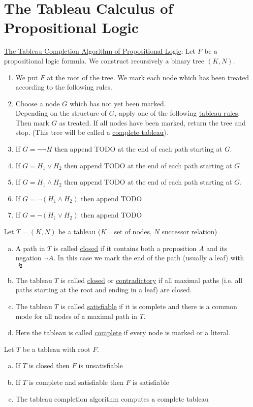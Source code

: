 \documentclass[a4paper]{article}
\newcommand{\ul}{\underline}
\begin{document}
\section{The Tableau Calculus of Propositional Logic}
\ul{The Tableau Completion Algorithm of Propositional Logic}: Let $F$ be a propositional logic formula. We construct recursively a binary tree $(K,N)$.
\begin{enumerate}[(1)]
	\item We put $F$ at the root of the tree. We mark each node which has been treated according to the following rules.
	\item Choose a node $G$ which has not yet been marked.\\
	Depending on the structure of $G$, apply one of the following \ul{tableau rules}. Then mark $G$ as treated. If all nodes have been marked, return the tree and stop. (This tree will be called a \ul{complete tableau}).
	\item If $G=\neg\neg H$ then append TODO at the end of each path starting at $G$.
	\item If $G=H_1\vee H_2$ then append TODO at the end of each path starting at $G$
	\item If $G=H_1\wedge H_2$ then append TODO at the end of each path starting at $G$.
	\item If $G=\neg (H_1\wedge H_2)$ then append TODO
	\item If $G=\neg (H_1\vee H_2)$ then append TODO
\end{enumerate}
Let $T=(K,N)$ be a tableau ($K$= set of nodes, $N$ successor relation)
\begin{enumerate}[(a)]
	\item A path in $T$ is called \ul{closed} if it contains both a proposition $A$ and its negation $\neg A$. In this case we mark the end of the path (usually a leaf) with $\lightning$
	\item The tableau $T$ is called \ul{closed} or \ul{contradictory} if all maximal paths (i.e. all paths starting at the root and ending in a leaf) are closed.
	\item The tableau $T$ is called \ul{satisfiable} if it is complete and there is a common mode for all nodes of a maximal path in $T$.
	\item Here the tableau is called \ul{complete} if every node is marked or a literal.
\end{enumerate}
Let $T$ be a tableau with root $F$.
\begin{enumerate}[(a)]
	\item If $T$ is closed then $F$ is unsatisfiable
	\item If $T$ is complete and satisfiable then $F$ is satisfiable
	\item The tableau completion algorithm computes a complete tableau
\end{enumerate}
\end{document}
